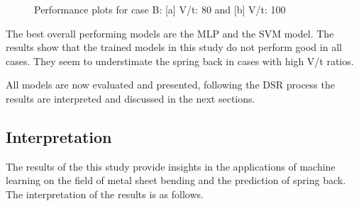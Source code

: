 \begin{figure}[h]
    \begin{tcolorbox}[arc=0pt,boxrule=0.5pt]
        \centering
        \caption{Performance plots for case B: [a] V/t: 80 and [b] V/t: 100}
        \label{fig:performance-case-c}
    \end{tcolorbox}
\end{figure}


The best overall performing models are the \ac{MLP} and the \ac{SVM} model.
The results show that the trained models in this study do not perform good in all cases.
They seem to understimate the spring back in cases with high V/t ratios.

All models are now evaluated and presented, following the DSR process the results are interpreted and discussed in
the next sections.

\subsection{Interpretation}\label{subsec:interpretation-of-results}

The results of the this study provide insights in the applications of machine learning on the field of metal sheet
bending and the prediction of spring back.
The interpretation of the results is as follows.

